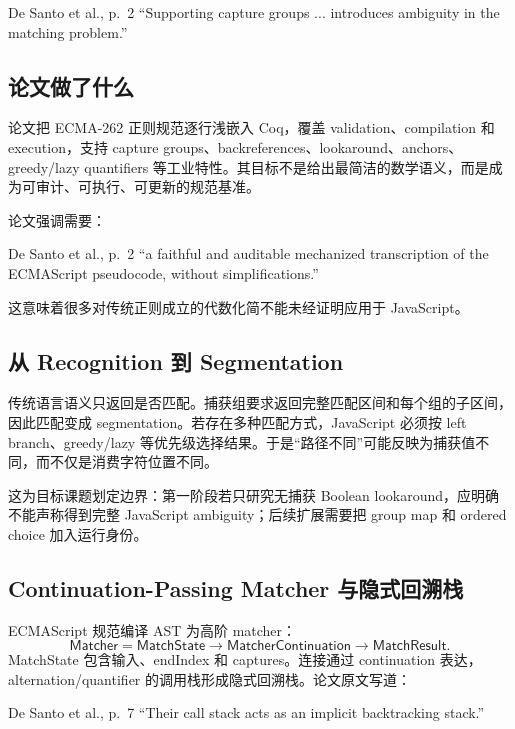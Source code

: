\documentclass[UTF8,a4paper,12pt]{ctexart}
\begin{document}
\begin{paperquote}{De Santo et al., p.~2}
``Supporting capture groups ... introduces ambiguity in the matching problem.''
\end{paperquote}

\subsection{论文做了什么}

论文把 ECMA-262 正则规范逐行浅嵌入 Coq，覆盖 validation、compilation 和 execution，支持 capture groups、backreferences、lookaround、anchors、greedy/lazy quantifiers 等工业特性。其目标不是给出最简洁的数学语义，而是成为可审计、可执行、可更新的规范基准\cite[pp.~1--3]{desanto2024}。

论文强调需要：
\begin{paperquote}{De Santo et al., p.~2}
``a faithful and auditable mechanized transcription of the ECMAScript pseudocode, without simplifications.''
\end{paperquote}
这意味着很多对传统正则成立的代数化简不能未经证明应用于 JavaScript。

\subsection{从 Recognition 到 Segmentation}

传统语言语义只返回是否匹配。捕获组要求返回完整匹配区间和每个组的子区间，因此匹配变成 segmentation。若存在多种匹配方式，JavaScript 必须按 left branch、greedy/lazy 等优先级选择结果。于是“路径不同”可能反映为捕获值不同，而不仅是消费字符位置不同。

这为目标课题划定边界：第一阶段若只研究无捕获 Boolean lookaround，应明确不能声称得到完整 JavaScript ambiguity；后续扩展需要把 group map 和 ordered choice 加入运行身份。

\subsection{Continuation-Passing Matcher 与隐式回溯栈}

ECMAScript 规范编译 AST 为高阶 matcher：
\[
\mathsf{Matcher}=\mathsf{MatchState}\to
\mathsf{MatcherContinuation}\to\mathsf{MatchResult}.
\]
MatchState 包含输入、endIndex 和 captures。连接通过 continuation 表达，alternation/quantifier 的调用栈形成隐式回溯栈。论文原文写道：
\begin{paperquote}{De Santo et al., p.~7}
``Their call stack acts as an implicit backtracking stack.''
\end{paperquote}
\end{document}
